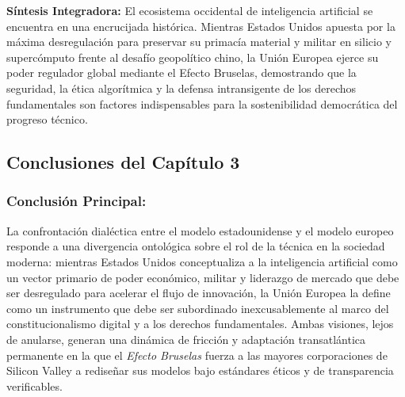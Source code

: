 \vspace{0.15cm}
\begin{cajabeige}
\textbf{Síntesis Integradora:} El ecosistema occidental de inteligencia artificial se encuentra en una encrucijada histórica. Mientras Estados Unidos apuesta por la máxima desregulación para preservar su primacía material y militar en silicio y supercómputo frente al desafío geopolítico chino, la Unión Europea ejerce su poder regulador global mediante el Efecto Bruselas, demostrando que la seguridad, la ética algorítmica y la defensa intransigente de los derechos fundamentales son factores indispensables para la sostenibilidad democrática del progreso técnico.
\end{cajabeige}

\newpage
{}

\subsection*{Conclusiones del Capítulo 3}

\subsubsection*{Conclusión Principal:}
La confrontación dialéctica entre el modelo estadounidense y el modelo europeo responde a una divergencia ontológica sobre el rol de la técnica en la sociedad moderna: mientras Estados Unidos conceptualiza a la inteligencia artificial como un vector primario de poder económico, militar y liderazgo de mercado que debe ser desregulado para acelerar el flujo de innovación, la Unión Europea la define como un instrumento que debe ser subordinado inexcusablemente al marco del constitucionalismo digital y a los derechos fundamentales. Ambas visiones, lejos de anularse, generan una dinámica de fricción y adaptación transatlántica permanente en la que el \textit{Efecto Bruselas} fuerza a las mayores corporaciones de Silicon Valley a rediseñar sus modelos bajo estándares éticos y de transparencia verificables.

